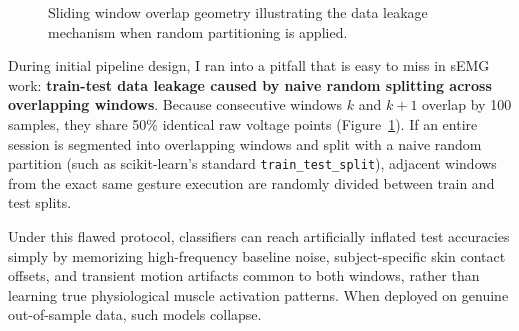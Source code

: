 \documentclass[11pt,a4paper]{article}
\begin{document}
\begin{figure}[htbp]
\centering
{}
\caption{Sliding window overlap geometry illustrating the data leakage mechanism when random partitioning is applied.}
\label{fig:window_leakage}
\end{figure}

During initial pipeline design, I ran into a pitfall that is easy to miss in sEMG work: \textbf{train-test data leakage caused by naive random splitting across overlapping windows}. Because consecutive windows $k$ and $k+1$ overlap by 100 samples, they share 50\% identical raw voltage points (Figure~\ref{fig:window_leakage}). If an entire session is segmented into overlapping windows and split with a naive random partition (such as scikit-learn's standard \texttt{train\_test\_split}), adjacent windows from the exact same gesture execution are randomly divided between train and test splits.

Under this flawed protocol, classifiers can reach artificially inflated test accuracies simply by memorizing high-frequency baseline noise, subject-specific skin contact offsets, and transient motion artifacts common to both windows, rather than learning true physiological muscle activation patterns. When deployed on genuine out-of-sample data, such models collapse.
\end{document}
